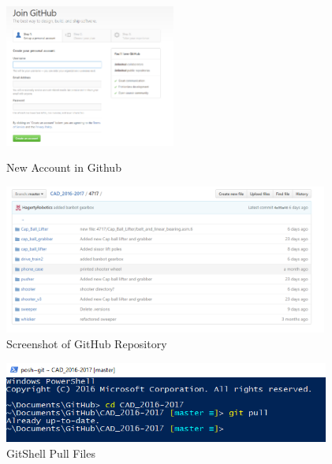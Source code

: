 \begin{figure}[ht]
\centering
\begin{minipage}[b]{.48\textwidth}
  \centering
  \includegraphics[width=0.5\textwidth]{Meetings/September/09-23-21/githubnewacc.png}
  \caption{New Account in Github}
  \label{fig:pic1}
\end{minipage}%
\hfill%
\begin{minipage}[b]{.48\textwidth}
  \centering
  \includegraphics[width=0.95\textwidth]{Meetings/September/09-23-21/githubrepository.png}
  \caption{Screenshot of GitHub Repository}
  \label{fig:pic2}
\end{minipage}
\end{figure}




\begin{figure}
\centering
\includegraphics[width=0.955\textwidth, angle=0]{Meetings/September/09-23-21/gitshellpull.png}
\caption{GitShell Pull Files}
\label{fig:pic3}
\end{figure}


